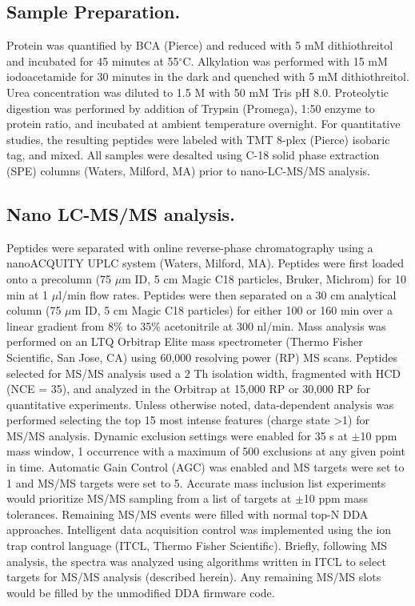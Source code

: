 \subsection*{Sample Preparation.}
Protein was quantified by BCA (Pierce) and reduced with 5 mM dithiothreitol and incubated for 45 minutes at 55$^\circ$C. Alkylation was performed with 15 mM iodoacetamide for 30 minutes in the dark and quenched with 5 mM dithiothreitol. Urea concentration was diluted to 1.5 M with 50 mM Tris pH 8.0. Proteolytic digestion was performed by addition of Trypsin (Promega), 1:50 enzyme to protein ratio, and incubated at ambient temperature overnight. For quantitative studies, the resulting peptides were labeled with TMT 8-plex (Pierce) isobaric tag, and mixed.\cite{tmt8,tmt82} All samples were desalted using C-18 solid phase extraction (SPE) columns (Waters, Milford, MA) prior to nano-LC-MS/MS analysis.

\subsection*{Nano LC-MS/MS analysis.}
Peptides were separated with online reverse-phase chromatography using a nanoACQUITY UPLC system (Waters, Milford, MA). Peptides were first loaded onto a precolumn (75 $\mu$m ID, 5 cm Magic C18 particles, Bruker, Michrom) for 10 min at 1 $\mu$l/min flow rates. Peptides were then separated on a 30 cm analytical column (75 $\mu$m ID, 5 cm Magic C18 particles) for either 100 or 160 min over a linear gradient from 8\% to 35\% acetonitrile at 300 nl/min. Mass analysis was performed on an LTQ Orbitrap Elite mass spectrometer (Thermo Fisher Scientific, San Jose, CA) using 60,000 resolving power (RP) MS scans.\cite{orbielite} Peptides selected for MS/MS analysis used a 2 Th isolation width, fragmented with HCD (NCE = 35), and analyzed in the Orbitrap at 15,000 RP or 30,000 RP for quantitative experiments. Unless otherwise noted, data-dependent analysis was performed selecting the top 15 most intense \mz{} features (charge state >1) for MS/MS analysis. Dynamic exclusion settings were enabled for 35 s at $\pm$10 ppm mass window, 1 occurrence with a maximum of 500 exclusions at any given point in time. Automatic Gain Control (AGC) was enabled and MS targets were set to 1 and MS/MS targets were set to 5. Accurate mass inclusion list experiments would prioritize MS/MS sampling from a list of targets at $\pm$10 ppm mass tolerances. Remaining MS/MS events were filled with normal top-N DDA approaches. Intelligent data acquisition control was implemented using the ion trap control language (ITCL, Thermo Fisher Scientific). Briefly, following MS analysis, the spectra was analyzed using algorithms written in ITCL to select targets for MS/MS analysis (described herein). Any remaining MS/MS slots would be filled by the unmodified DDA firmware code.

